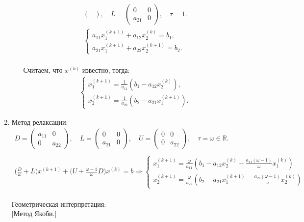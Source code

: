 \documentclass[12pt,a4paper]{article}
\begin{document}
\begin{enumerate}
\begin{enumerate}
\begin{gather*}
\begin{pmatrix}
\end{pmatrix}, \quad
L=
\begin{pmatrix}
0 & 0\\
a_{21} & 0
\end{pmatrix}, \quad \tau=1.\\
\begin{cases}
a_{11} x_1^{(k+1)}+a_{12} x_2^{(k)}=b_1,\\
a_{21} x_1^{(k+1)}+a_{22} x_2^{(k+1)}=b_2.
\end{cases}
\end{gather*}
\\
Считаем, что $x^{(k)}$ известно, тогда:
\begin{gather*}
\begin{cases}
x_1^{(k+1)}=\frac{1}{a_{11}} (b_1-a_{12} x_2^{(k)}),\\
x_2^{(k+1)}=\frac{1}{a_{22}} (b_2-a_{21} x_1^{(k+1)}).
\end{cases}
\end{gather*}
\end{enumerate}
\item Метод релаксации:\\
\begin{gather*}
D=
\begin{pmatrix}
a_{11} & 0\\
0 & a_{22}
\end{pmatrix}, \quad
L=
\begin{pmatrix}
0 & 0\\
a_{21} & 0
\end{pmatrix}, \quad 
U=
\begin{pmatrix}
0 & 0\\
0 & a_{22}
\end{pmatrix}, \quad \tau=\omega\in\mathbb{R}.\\
\\
\Biggl(\frac{D}{\omega}+L\Biggr)x^{(k+1)}+\Biggl(U+\frac{\omega-1}{\omega} D\Biggr) x^{(k)}=b \Longrightarrow
\begin{cases}
x_1^{(k+1)}=\frac{\omega}{a_{11}} (b_1-a_{12} x_2^{(k)}-\frac{a_{11}(\omega-1)}{\omega} x_1^{(k)})\\
x_2^{(k+1)}=\frac{\omega}{a_{22}} (b_2-a_{21} x_1^{(k+1)}-\frac{a_{22} (\omega-1)}{\omega} x_2^{(k)})
\end{cases}
\end{gather*}
\\
Геометрическая интерпретация:\\
[Метод Якоби.]\\

\end{enumerate}
\end{document}
